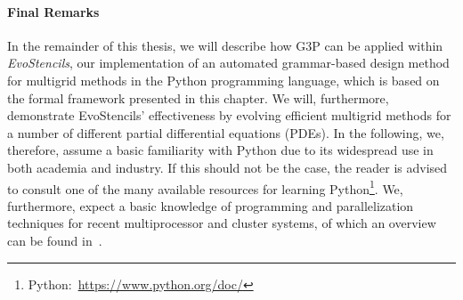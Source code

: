 \paragraph{Final Remarks}
In the remainder of this thesis, we will describe how G3P can be applied within \emph{EvoStencils}, our implementation of an automated grammar-based design method for multigrid methods in the Python programming language, which is based on the formal framework presented in this chapter.
We will, furthermore, demonstrate EvoStencils' effectiveness by evolving efficient multigrid methods for a number of different partial differential equations (PDEs).
In the following, we, therefore, assume a basic familiarity with Python due to its widespread use in both academia and industry.
If this should not be the case, the reader is advised to consult one of the many available resources for learning Python\footnote{Python:~\url{https://www.python.org/doc/}}.
We, furthermore, expect a basic knowledge of programming and parallelization techniques for recent multiprocessor and cluster systems, of which an overview can be found in~\cite{sterling2017high,hager2010introduction}.
